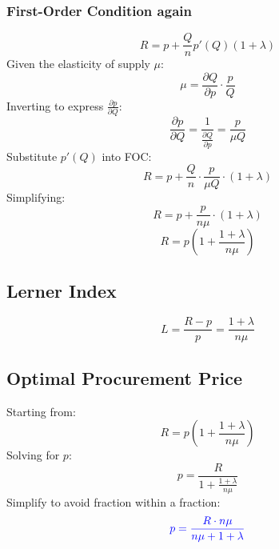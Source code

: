 \documentclass[12pt]{article}
\begin{document}
\subsubsection{First-Order Condition again}
\begin{equation}
R = p + \frac{Q}{n} p'(Q) (1 + \lambda)
\end{equation}
Given the elasticity of supply \(\mu\):
\begin{equation}
\mu = \frac{\partial Q}{\partial p} \cdot \frac{p}{Q}
\end{equation}
Inverting to express \(\frac{\partial p}{\partial Q}\):
\begin{equation}
\frac{\partial p}{\partial Q} = \frac{1}{\frac{\partial Q}{\partial p}} = \frac{p}{\mu Q}
\end{equation}
Substitute \( p'(Q) \) into FOC:
\begin{equation}
R = p + \frac{Q}{n} \cdot \frac{p}{\mu Q} \cdot (1 + \lambda)
\end{equation}
Simplifying:
\begin{equation}
R = p + \frac{p}{n \mu} \cdot (1 + \lambda)
\end{equation}
\begin{equation}
R = p \left(1 + \frac{1 + \lambda}{n \mu}\right)
\end{equation}

\subsection{Lerner Index}
\begin{equation}
L = \frac{R - p}{p} = \frac{1 + \lambda}{n \mu}
\end{equation}

\subsection{Optimal Procurement Price}
Starting from:
\begin{equation}
R = p \left(1 + \frac{1 + \lambda}{n \mu}\right)
\end{equation}
Solving for \( p \):
\begin{equation}
p = \frac{R}{1 + \frac{1 + \lambda}{n \mu}}
\end{equation}
Simplify to avoid fraction within a fraction:
\begin{equation}
\textcolor{blue}{p = \frac{R \cdot n \mu}{n \mu + 1 + \lambda}}
\label{Eq: optimal procure price, general case}
\end{equation}
\end{document}
